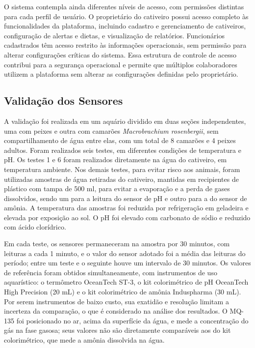 \documentclass[11pt,a4paper]{article}
\begin{document}
O sistema contempla ainda diferentes níveis de acesso, com permissões distintas para cada perfil de usuário. O proprietário do cativeiro possui acesso completo às funcionalidades da plataforma, incluindo cadastro e gerenciamento de cativeiros, configuração de alertas e dietas, e visualização de relatórios. Funcionários cadastrados têm acesso restrito às informações operacionais, sem permissão para alterar configurações críticas do sistema. Essa estrutura de controle de acesso contribui para a segurança operacional e permite que múltiplos colaboradores utilizem a plataforma sem alterar as configurações definidas pelo proprietário.
 
\subsection{Validação dos Sensores}
\label{sec:validacao-sensores}
 
A validação foi realizada em um aquário dividido em duas seções independentes, uma com peixes e outra com camarões \textit{Macrobrachium rosenbergii}, sem compartilhamento de água entre elas, com um total de 8 camarões e 4 peixes adultos. Foram realizados seis testes, em diferentes condições de temperatura e pH. Os testes 1 e 6 foram realizados diretamente na água do cativeiro, em temperatura ambiente. Nos demais testes, para evitar risco aos animais, foram utilizadas amostras de água retiradas do cativeiro, mantidas em recipientes de plástico com tampa de 500 ml, para evitar a evaporação e a perda de gases dissolvidos, sendo um para a leitura do sensor de pH e outro para a do sensor de amônia. A temperatura das amostras foi reduzida por refrigeração em geladeira e elevada por exposição ao sol. O pH foi elevado com carbonato de sódio e reduzido com ácido clorídrico.
 
Em cada teste, os sensores permaneceram na amostra por 30 minutos, com leituras a cada 1 minuto, e o valor do sensor adotado foi a média das leituras do período; entre um teste e o seguinte houve um intervalo de 30 minutos. Os valores de referência foram obtidos simultaneamente, com instrumentos de uso aquarístico: o termômetro OceanTech ST-3, o kit colorimétrico de pH OceanTech High Precision (20 mL) e o kit colorimétrico de amônia Induspharma (30 mL). Por serem instrumentos de baixo custo, sua exatidão e resolução limitam a incerteza da comparação, o que é considerado na análise dos resultados. O MQ-135 foi posicionado no ar, acima da superfície da água, e mede a concentração do gás na fase gasosa; seus valores não são diretamente comparáveis aos do kit colorimétrico, que mede a amônia dissolvida na água.
 
\end{document}
